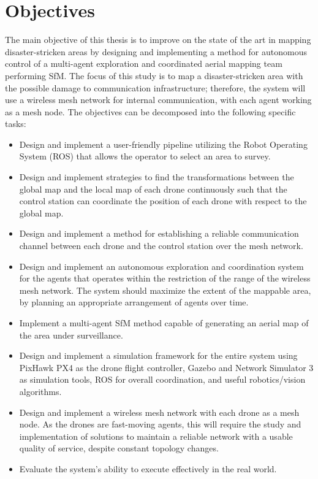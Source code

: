 \section{Objectives}
The main objective of this thesis is to improve on the state of the art in mapping disaster-stricken areas by designing and implementing a method for autonomous control of a multi-agent exploration and coordinated aerial mapping team performing SfM. The focus of this study is to map a disaster-stricken area with the possible damage to communication infrastructure; therefore, the system will use a wireless mesh network for internal communication, with each agent working as a mesh node. The objectives can be decomposed into the following specific tasks:
\begin{itemize}
	\item Design and implement a user-friendly pipeline utilizing the Robot Operating System (ROS) that allows the operator to select an area to survey.
	
	\item Design and implement strategies to find the transformations between the global map and the local map of each drone continuously such that the control station can coordinate the position of each drone with respect to the global map.
	
	\item Design and implement a method for establishing a reliable communication channel between each drone and the control station over the mesh network.
	
	\item Design and implement an autonomous exploration and coordination system for the agents that operates within the restriction of the range of the wireless mesh network. The system should maximize the extent of the mappable area, by planning an appropriate arrangement of agents over time.
	
	\item Implement a multi-agent SfM method capable of generating an aerial map of the area under surveillance.
	
	\item Design and implement a simulation framework for the entire system using PixHawk PX4 as the drone flight controller, Gazebo and Network Simulator 3 as simulation tools, ROS for overall coordination, and useful robotics/vision algorithms.
	
	\item Design and implement a wireless mesh network with each drone as a mesh node. As the drones are fast-moving agents, this will require the study and implementation of solutions to maintain a reliable network with a usable quality of service, despite constant topology changes.
	
	\item Evaluate the system's ability to execute effectively in the real world.
\end{itemize}

